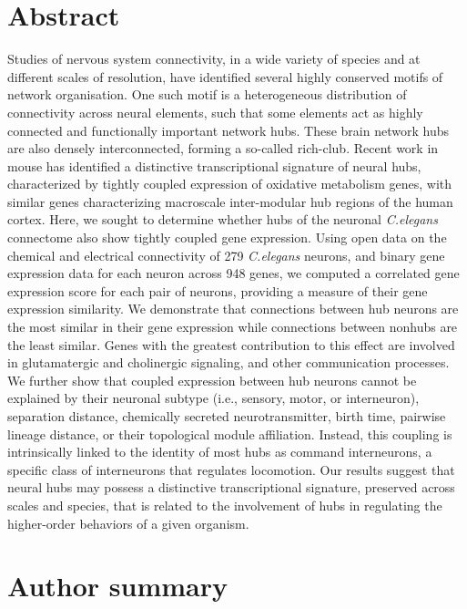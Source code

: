 \section*{Abstract}
Studies of nervous system connectivity, in a wide variety of species and at different scales of resolution, have identified several highly conserved motifs of network organisation.
One such motif is a heterogeneous distribution of connectivity across neural elements, such that some elements act as highly connected and functionally important network hubs.
These brain network hubs are also densely interconnected, forming a so-called rich-club.
Recent work in mouse has identified a distinctive transcriptional signature of neural hubs, characterized by tightly coupled expression of oxidative metabolism genes, with similar genes characterizing macroscale inter-modular hub regions of the human cortex.
Here, we sought to determine whether hubs of the neuronal \textit{C.elegans} connectome also show tightly coupled gene expression. Using open data on the chemical and electrical connectivity of 279 \textit{C.elegans} neurons, and binary gene expression data for each neuron across 948 genes, we computed a correlated gene expression score for each pair of neurons, providing a measure of their gene expression similarity.
We demonstrate that connections between hub neurons are the most similar in their gene expression while connections between nonhubs are the least similar.
Genes with the greatest contribution to this effect are involved in glutamatergic and cholinergic signaling, and other communication processes.
We further show that coupled expression between hub neurons cannot be explained by their neuronal subtype (i.e., sensory, motor, or interneuron), separation distance, chemically secreted neurotransmitter, birth time, pairwise lineage distance, or their topological module affiliation.
Instead, this coupling is intrinsically linked to the identity of most hubs as command interneurons, a specific class of interneurons that regulates locomotion.
Our results suggest that neural hubs may possess a distinctive transcriptional signature, preserved across scales and species, that is related to the involvement of hubs in regulating the higher-order behaviors of a given organism.

\section*{Author summary}

